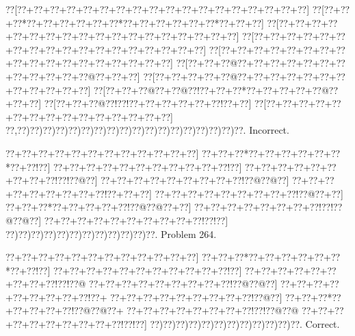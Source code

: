 \documentclass[a5paper]{article}
\begin{document}
\begin{center}
{\goo
\0??[\0??+\0??+\0??+\0??+\0??+\0??+\0??+\0??+\0??+\0??+\0??+\0??+\0??+\0??+\0??+\0??+\0??+\0??]
\0??[\0??+\0??+\0??*\0??+\0??+\0??+\0??+\0??+\0??*\0??+\0??+\0??+\0??+\0??+\0??*\0??+\0??+\0??]
\0??[\0??+\0??+\0??+\0??+\0??+\0??+\0??+\0??+\0??+\0??+\0??+\0??+\0??+\0??+\0??+\0??+\0??+\0??]
\0??[\0??+\0??+\0??+\0??+\0??+\0??+\0??+\0??+\0??+\0??+\0??+\0??+\0??+\0??+\0??+\0??+\0??+\0??]
\0??[\0??+\0??+\0??+\0??+\0??+\0??+\0??+\0??+\0??+\0??+\0??+\0??+\0??+\0??+\0??+\0??+\0??+\0??]
\0??[\0??+\0??+\0??@\0??+\0??+\0??+\0??+\0??+\0??+\0??+\0??+\0??+\0??+\0??+\0??@\0??+\0??+\0??]
\0??[\0??+\0??+\0??+\0??+\0??@\0??+\0??+\0??+\0??+\0??+\0??+\0??+\0??+\0??+\0??+\0??+\0??]
\0??[\0??+\0??+\0??@\0??+\0??@\0??!\0??+\0??+\0??*\0??+\0??+\0??+\0??+\0??@\0??+\0??+\0??]
\0??[\0??+\0??+\0??@\0??!\0??!\0??+\0??+\0??+\0??+\0??+\0??!\0??+\0??]
\0??[\0??+\0??+\0??+\0??+\0??+\0??+\0??+\0??+\0??+\0??+\0??+\0??+\0??+\0??+\0??]
\0??,\0??)\0??)\0??)\0??)\0??)\0??)\0??)\0??)\0??)\0??)\0??)\0??)\0??)\0??)\0??)\0??)\0??)\0??.
}
Incorrect. 

\end{center}
\newpage
\begin{center}
{\goo
\0??+\0??+\0??+\0??+\0??+\0??+\0??+\0??+\0??+\0??+\0??+\0??]
\0??+\0??+\0??*\0??+\0??+\0??+\0??+\0??+\0??*\0??+\0??!\0??]
\0??+\0??+\0??+\0??+\0??+\0??+\0??+\0??+\0??+\0??+\0??!\0??]
\0??+\0??+\0??+\0??+\0??+\0??+\0??+\0??+\0??!\0??!\0??@\0??]
\0??+\0??+\0??+\0??+\0??+\0??+\0??+\0??+\0??!\0??@\0??@\0??]
\0??+\0??+\0??+\0??+\0??+\0??+\0??+\0??+\0??!\0??+\0??+\0??]
\0??+\0??+\0??+\0??+\0??+\0??+\0??+\0??+\0??!\0??@\0??+\0??]
\0??+\0??+\0??*\0??+\0??+\0??+\0??+\0??!\0??@\0??@\0??+\0??]
\0??+\0??+\0??+\0??+\0??+\0??+\0??+\0??!\0??!\0??@\0??@\0??]
\0??+\0??+\0??+\0??+\0??+\0??+\0??+\0??+\0??+\0??!\0??!\0??]
\0??)\0??)\0??)\0??)\0??)\0??)\0??)\0??)\0??)\0??)\0??)\0??.
}
Problem 264.

\end{center}
\begin{center}
{\goo
\0??+\0??+\0??+\0??+\0??+\0??+\0??+\0??+\0??+\0??+\0??+\0??]
\0??+\0??+\0??*\0??+\0??+\0??+\0??+\0??+\0??*\0??+\0??!\0??]
\0??+\0??+\0??+\0??+\0??+\0??+\0??+\0??+\0??+\0??+\0??!\0??]
\0??+\0??+\0??+\0??+\0??+\0??+\0??+\0??+\0??!\0??!\0??@
\0??+\0??+\0??+\0??+\0??+\0??+\0??+\0??+\0??!\0??@\0??@\0??]
\0??+\0??+\0??+\0??+\0??+\0??+\0??+\0??+\0??!\0??+
\0??+\0??+\0??+\0??+\0??+\0??+\0??+\0??+\0??!\0??@\0??]
\0??+\0??+\0??*\0??+\0??+\0??+\0??+\0??!\0??@\0??@\0??+
\0??+\0??+\0??+\0??+\0??+\0??+\0??+\0??!\0??!\0??@\0??@
\0??+\0??+\0??+\0??+\0??+\0??+\0??+\0??+\0??+\0??!\0??!\0??]
\0??)\0??)\0??)\0??)\0??)\0??)\0??)\0??)\0??)\0??)\0??)\0??.
}
Correct. 

\end{center}
\end{document}
